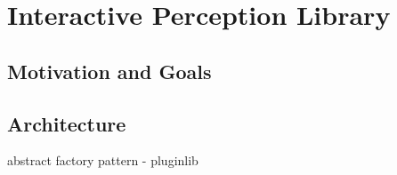 \chapter{Interactive Perception Library}
\label{chapter:Related Work}


\section{Motivation and Goals}
\section{Architecture}
\item abstract factory pattern - pluginlib